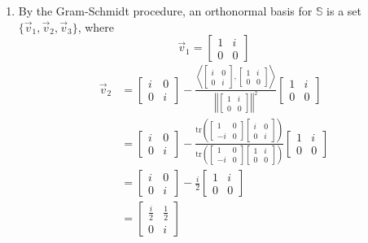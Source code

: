 \documentclass[10pt,english]{article}
\begin{document}
\begin{enumerate}
\pagebreak
\item By the Gram-Schmidt procedure, an orthonormal basis for $\mathbb{S}$ is a set $\{\vec{v}_1,\vec{v}_2,\vec{v}_3\}$, where 
$$\vec{v}_1=\begin{bmatrix}1&i\\0&0\end{bmatrix}$$ 
\begin{align*}
\vec{v}_2&=\begin{bmatrix}i&0\\0&i\end{bmatrix}-\frac{\left\langle\begin{bmatrix}i&0\\0&i\end{bmatrix},\begin{bmatrix}1&i\\0&0\end{bmatrix}\right\rangle}{\left|\left|\begin{bmatrix}1&i\\0&0\end{bmatrix}\right|\right|^2}\begin{bmatrix}1&i\\0&0\end{bmatrix}\\
&=\begin{bmatrix}i&0\\0&i\end{bmatrix}-\frac{\text{tr}\left(\begin{bmatrix}1&0\\-i&0\end{bmatrix}\begin{bmatrix}i&0\\0&i\end{bmatrix}\right)}{\text{tr}\left(\begin{bmatrix}1&0\\-i&0\end{bmatrix}\begin{bmatrix}1&i\\0&0\end{bmatrix}\right)}\begin{bmatrix}1&i\\0&0\end{bmatrix}\\&=\begin{bmatrix}i&0\\0&i\end{bmatrix}-\frac{i}{2}\begin{bmatrix}1&i\\0&0\end{bmatrix}\\&=\begin{bmatrix}\frac{i}{2}&\frac{1}{2}\\0&i\end{bmatrix}

\end{align*}
\end{enumerate}
\end{document}
